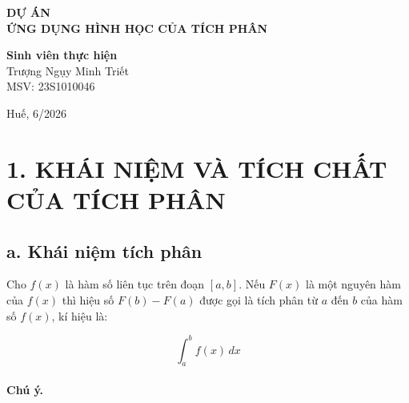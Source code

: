 \documentclass{article}
\begin{document}
\usetikzlibrary{calc}

\begin{titlepage}

    \centering
    \vspace*{3cm}
    

    {\Large \textbf{DỰ ÁN}\\[0.5cm]}
    {\Large \textbf{ỨNG DỤNG HÌNH HỌC CỦA TÍCH PHÂN}}

    \vfill

    \textbf{Sinh viên thực hiện}\\
    \vspace{0.3}
    Trượng Ngụy Minh Triết\\
    MSV: 23S1010046

    \vfill
    {\normalsize Huế, 6/2026}
\end{titlepage}

\section*{1. KHÁI NIỆM VÀ TÍCH CHẤT CỦA TÍCH PHÂN}

\subsection*{a. Khái niệm tích phân}

Cho $f(x)$ là hàm số liên tục trên đoạn $[a, b]$. Nếu $F(x)$ là một nguyên hàm của $f(x)$ thì hiệu số $F(b) - F(a)$ được gọi là tích phân từ $a$ đến $b$ của hàm số $f(x)$, kí hiệu là:

\[
\int_{a}^{b} f(x) \, dx
\]

\paragraph{Chú ý.}
\end{document}
